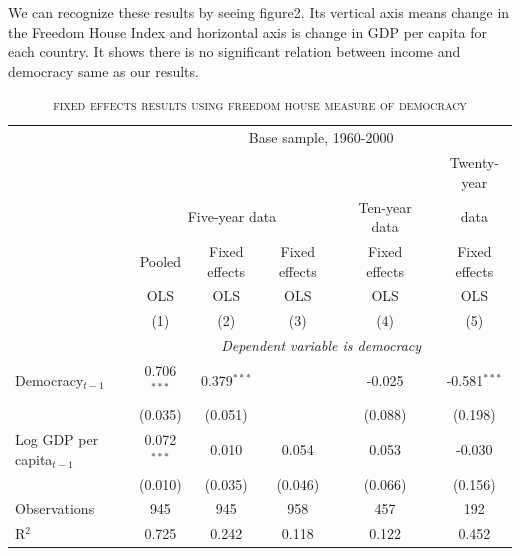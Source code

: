 We can recognize these results by seeing figure2. Its vertical axis means change in the Freedom House Index and horizontal axis is change in GDP per capita for each country. It shows there is no significant relation between income and democracy same as our results.
\begin{table}[h!] \centering
			\begin{adjustbox}{max width=\textwidth}
			\begin{threeparttable}
		\caption{\textsc{fixed effects results using freedom house measure of democracy}}
			\begin{tabular}{l*{7}{c}} 
		 \hline\hline
			    & \multicolumn{7}{c}{Base sample, 1960-2000}\\
	     \cline{2-8}
	            & & &&& & &Twenty-year\\[-1.8ex]
				& \multicolumn{3}{c}{Five-year data} && \multicolumn{1}{c}{Ten-year data} && \multicolumn{1}{c}{data}\\
		\cline{2-4}\cline{6-6}\cline{8-8}	
		    &Pooled &Fixed effects &Fixed effects &&Fixed effects &&Fixed effects \\[-1.8ex] 	
		    &OLS &OLS &OLS &&OLS &&OLS \\[-1.8ex] 			 
		        &\multicolumn{1}{c}{(1)} &\multicolumn{1}{c}{(2)} &\multicolumn{1}{c}{(3)} &&\multicolumn{1}{c}{(4)} &&\multicolumn{1}{c}{(5)}\\ 
		\hline
		 & \multicolumn{7}{c}{\textit{Dependent variable is democracy}}\\        
			Democracy$_{t-1}$ & 0.706$^{***}$ & 0.379$^{***}$ &  && -0.025 && -0.581$^{***}$ \\[-1.8ex] 
				 \ & (0.035) & (0.051) &  && (0.088) && (0.198) \\ 
				Log GDP per capita${}_{t-1}$ & 0.072$^{***}$ & 0.010 & 0.054 && 0.053 && -0.030 \\[-1.8ex] 
				 \ & (0.010) & (0.035) & (0.046) && (0.066) && (0.156) \\ 
				Observations & \multicolumn{1}{c}{945} & \multicolumn{1}{c}{945} & \multicolumn{1}{c}{958} && \multicolumn{1}{c}{457} && \multicolumn{1}{c}{192} \\ 
				R${}^{2}$ & \multicolumn{1}{c}{0.725} & \multicolumn{1}{c}{0.242} & \multicolumn{1}{c}{0.118} && \multicolumn{1}{c}{0.122} && \multicolumn{1}{c}{0.452} \\ 
				\hline 
			\end{tabular}
		\begin{tablenotes}

\end{tablenotes}
\end{threeparttable}
\end{adjustbox}
\end{table}
